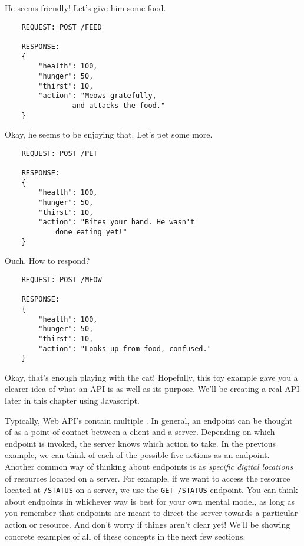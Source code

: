 \begin{kaobox}[title=Let's take a look at an example of a simple API.]
    He seems friendly! Let's give him some food.

    \begin{verbatim}
    REQUEST: POST /FEED

    RESPONSE: 
    {
        "health": 100,
        "hunger": 50,
        "thirst": 10,
        "action": "Meows gratefully, 
                and attacks the food."
    }
    \end{verbatim}

    Okay, he seems to be enjoying that. Let's pet some more.
    \begin{verbatim}
    REQUEST: POST /PET

    RESPONSE: 
    {
        "health": 100,
        "hunger": 50,
        "thirst": 10,
        "action": "Bites your hand. He wasn't 
            done eating yet!"
    }
    \end{verbatim}

    Ouch. How to respond?

    \begin{verbatim}
    REQUEST: POST /MEOW

    RESPONSE: 
    {
        "health": 100,
        "hunger": 50,
        "thirst": 10,
        "action": "Looks up from food, confused."
    }
    \end{verbatim}

    Okay, that's enough playing with the cat! Hopefully, this toy example gave you a clearer idea of what an API is as well as its purpose. We'll be creating a real API later in this chapter using Javascript.

\end{kaobox}

Typically, Web API's contain multiple . In general, an endpoint can be thought of as a point of contact between a client and a server. Depending on which endpoint is invoked, the server knows which action to take. In the previous example, we can think of each of the possible five actions as an endpoint. Another common way of thinking about endpoints is as \emph{specific digital locations} of resources located on a server. For example, if we want to access the resource located at \texttt{/STATUS} on a server, we use the \texttt{GET /STATUS} endpoint. You can think about endpoints in whichever way is best for your own mental model, as long as you remember that endpoints are meant to direct the server towards a particular action or resource. And don't worry if things aren't clear yet! We'll be showing concrete examples of all of these concepts in the next few sections.


